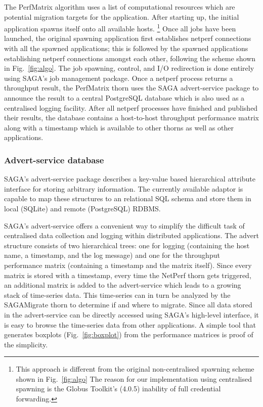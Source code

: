 \documentclass[conference,final]{IEEEtran}
\begin{document}
{The PerfMatrix algorithm uses a list of computational resources which
are potential migration targets for the application. After starting
up, the initial application spawns itself onto all available hosts.
\footnote{This approach is different from the original non-centralised
  spawning scheme shown in Fig.~\ref{fig:algo} The reason for our
  implementation using centralised spawning is the Globus Toolkit's
  (4.0.5) inability of full credential forwarding.} Once all jobs have
been launched, the original spawning application first establishes
netperf connections with all the spawned applications; this is
followed by the spawned applications establishing netperf connections
amongst each other, following the scheme shown in Fig.~\ref{fig:algo}.
The job spawning, control, and I/O redirection is done entirely using
SAGA's job management package.  Once a netperf process returns a
throughput result, the PerfMatrix thorn uses the SAGA advert-service
package to announce the result to a central PostgreSQL database which
is also used as a centralised logging facility. After all netperf
processes have finished and published their results, the database
contains a host-to-host throughput performance matrix along with a
timestamp which is available to other thorns as well as other
applications.

\subsubsection{Advert-service database} SAGA's advert-service package
describes a key-value based hierarchical attribute interface for
storing arbitrary information. The currently available adaptor is
capable to map these structures to an relational SQL schema and store
them in local (SQLite) and remote (PostgreSQL) RDBMS.

SAGA's advert-service offers a convenient way to simplify the
difficult task of centralised data collection and logging within
distributed applications. The advert structure consists of two
hierarchical trees: one for logging (containing the host name, a
timestamp, and the log message) and one for the throughput performance
matrix (containing a timestamp and the matrix itself). Since every
matrix is stored with a timestamp, every time the NetPerf thorn gets
triggered, an additional matrix is added to the advert-service which
leads to a growing stack of time-series data. This time-series can in
turn be analyzed by the SAGAMigrate thorn to determine if and where
to migrate.  Since all data stored in the advert-service can be
directly accessed using SAGA's high-level interface, it is easy to
browse the time-series data from other applications. A simple tool
that generates boxplots (Fig.~\ref{fig:boxplot}) from the performance
matrices is proof of the simplicity.

}
\end{document}
